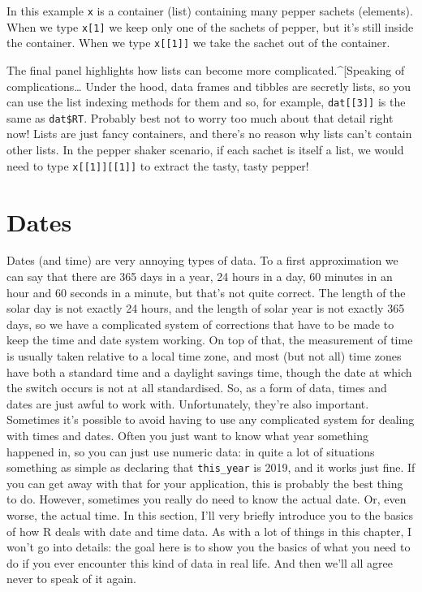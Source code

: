 \documentclass[]{book}
\begin{document}
In this example \texttt{x} is a container (list) containing many pepper sachets (elements). When we type \texttt{x{[}1{]}} we keep only one of the sachets of pepper, but it's still inside the container. When we type \texttt{x{[}{[}1{]}{]}} we take the sachet out of the container.

The final panel highlights how lists can become more complicated.\^{}{[}Speaking of complications\ldots{} Under the hood, data frames and tibbles are secretly lists, so you can use the list indexing methods for them and so, for example, \texttt{dat{[}{[}3{]}{]}} is the same as \texttt{dat\$RT}. Probably best not to worry too much about that detail right now! Lists are just fancy containers, and there's no reason why lists can't contain other lists. In the pepper shaker scenario, if each sachet is itself a list, we would need to type \texttt{x{[}{[}1{]}{]}{[}{[}1{]}{]}} to extract the tasty, tasty pepper!

\hypertarget{dates}{%
\section{Dates}\label{dates}}

Dates (and time) are very annoying types of data. To a first approximation we can say that there are 365 days in a year, 24 hours in a day, 60 minutes in an hour and 60 seconds in a minute, but that's not quite correct. The length of the solar day is not exactly 24 hours, and the length of solar year is not exactly 365 days, so we have a complicated system of corrections that have to be made to keep the time and date system working. On top of that, the measurement of time is usually taken relative to a local time zone, and most (but not all) time zones have both a standard time and a daylight savings time, though the date at which the switch occurs is not at all standardised. So, as a form of data, times and dates are just awful to work with. Unfortunately, they're also important. Sometimes it's possible to avoid having to use any complicated system for dealing with times and dates. Often you just want to know what year something happened in, so you can just use numeric data: in quite a lot of situations something as simple as declaring that \texttt{this\_year} is 2019, and it works just fine. If you can get away with that for your application, this is probably the best thing to do. However, sometimes you really do need to know the actual date. Or, even worse, the actual time. In this section, I'll very briefly introduce you to the basics of how R deals with date and time data. As with a lot of things in this chapter, I won't go into details: the goal here is to show you the basics of what you need to do if you ever encounter this kind of data in real life. And then we'll all agree never to speak of it again.
\end{document}
